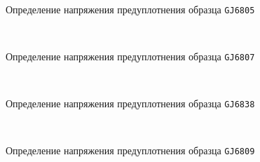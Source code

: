 \begin{figure}[ht]
    {\centering
      \def\svgwidth{11.8cm} %
      \small
      \hfill 
      \\
      \hfill  
      \def\svgwidth{11.7cm}
      \hfill 
      }
      \caption{Определение напряжения предуплотнения образца \texttt{GJ6805}}
      \label{img:6805}
    \end{figure}
    
    \begin{figure}
        {\centering
        \small
          \hfill 
          \\
          \hfill  
          \hfill 
          }
          \caption{Определение напряжения предуплотнения образца \texttt{GJ6807}}
          \label{img:6807}
    \end{figure}
    
    \begin{figure}
        {\centering
        \small
            \hfill 
            \\
            \hfill  
            \hfill 
            }
            \caption{Определение напряжения предуплотнения образца \texttt{GJ6838}}
            \label{img:6838}
    \end{figure}
    
    
    \begin{figure}
        {\centering
        \small
            \hfill 
            \\
            \hfill  
            \hfill 
            }
            \caption{Определение напряжения предуплотнения образца \texttt{GJ6809}}
            \label{img:6809}
    \end{figure}
    
